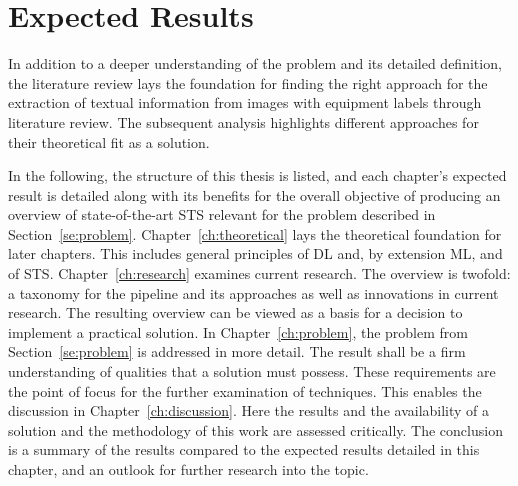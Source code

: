\section{Expected Results}
In addition to a deeper understanding of the problem and its detailed definition, the literature
review lays the foundation for finding the right approach for the extraction of textual
information from images with equipment labels through literature review.
The subsequent analysis highlights different approaches for their theoretical fit as a
solution.

In the following, the structure of this thesis is listed, and each chapter's expected
result is detailed along with its benefits for the overall objective of producing an overview of
state-of-the-art \ac{STS} relevant for the problem described in Section~\ref{se:problem}.
Chapter~\ref{ch:theoretical} lays the theoretical foundation for later chapters.
This includes general principles of \ac{DL} and, by extension \ac{ML}, and of \ac{STS}.
Chapter~\ref{ch:research} examines current research.
The overview is twofold: a taxonomy for the pipeline and its approaches as well as innovations in
current research.
The resulting overview can be viewed as a basis for a decision to implement a
practical solution.
In Chapter~\ref{ch:problem}, the problem from Section~\ref{se:problem} is addressed in more detail.
The result shall be a firm understanding of qualities that a solution must possess.
These requirements are the point of focus for the further examination of techniques.
This enables the discussion in Chapter~\ref{ch:discussion}.
Here the results and the availability of a solution and the methodology of this work
are assessed critically.
The conclusion is a summary of the results compared to the expected results detailed in this chapter,
and an outlook for further research into the topic.
